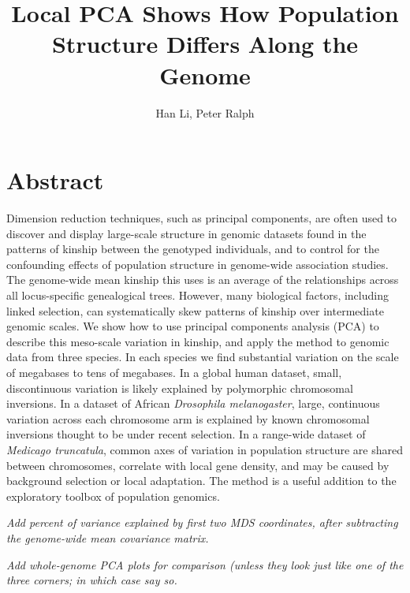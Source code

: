 \documentclass[11pt, oneside]{article}   	%
\title{Local PCA Shows How Population Structure Differs Along the Genome}
\author{Han Li, Peter Ralph}
\newcommand{\plr}[1]{{\em \color{blue} #1}}
\begin{document}
\maketitle
\doublespacing


\section*{Abstract}

Dimension reduction techniques,
such as principal components,
are often used to discover and display large-scale structure in genomic datasets
found in the patterns of kinship
between the genotyped individuals,
and to control for the confounding effects of population structure in genome-wide association studies.
The genome-wide mean kinship this uses
is an average of the relationships across all locus-specific genealogical trees.
However, many biological factors,
including linked selection,
can systematically skew patterns of kinship over intermediate genomic scales.
We show how to use principal components analysis (PCA) to describe this meso-scale variation in kinship,
and apply the method to genomic data from three species.
In each species we find substantial variation on the scale of megabases to tens of megabases.
In a global human dataset, small, discontinuous variation is likely explained by polymorphic chromosomal inversions.
In a dataset of African \textit{Drosophila melanogaster}, large, continuous variation across each chromosome arm
is explained by known chromosomal inversions thought to be under recent selection.
In a range-wide dataset of \textit{Medicago truncatula},
common axes of variation in population structure are shared between chromosomes,
correlate with local gene density,
and may be caused by background selection or local adaptation.
The method is a useful addition to the exploratory toolbox
of population genomics.

\plr{Add percent of variance explained by first two MDS coordinates, after subtracting the genome-wide mean covariance matrix.}

\plr{Add whole-genome PCA plots for comparison (unless they look just like one of the three corners; in which case say so.}
\end{document}
